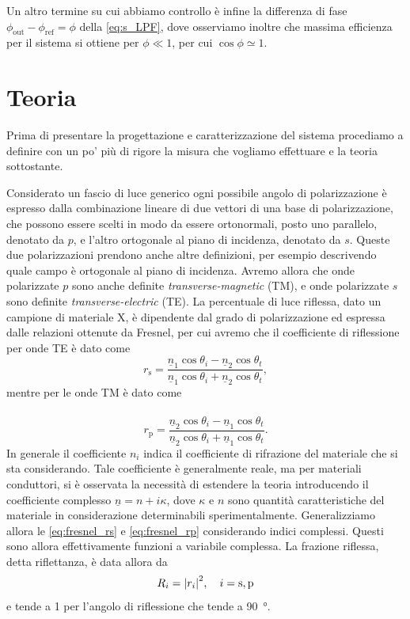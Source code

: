 \documentclass[
    prb,altaffilletter,citeautoscript,
    amsmath,amssymb,
    showpacs,showkeys,floatfix,
    reprint
]{revtex4-1}
\begin{document}
Un altro termine su cui abbiamo controllo è infine la differenza di fase $\phi_\mathrm{out} - \phi_\mathrm{ref} = \phi$ della \eqref{eq:s_LPF}, dove osserviamo inoltre che massima efficienza per il sistema si ottiene per $\phi\ll 1$, per cui $\cos\phi\simeq1$.

\section{Teoria}

Prima di presentare la progettazione e caratterizzazione del sistema procediamo a definire con un po' più di rigore la misura che vogliamo effettuare e la teoria sottostante. 

Considerato un fascio di luce generico ogni possibile angolo di polarizzazione è espresso dalla combinazione lineare di due vettori di una base di polarizzazione, che possono essere scelti in modo da essere ortonormali, posto uno parallelo, denotato da $p$, e l'altro ortogonale al piano di incidenza, denotato da $s$. Queste due polarizzazioni prendono anche altre definizioni, per esempio descrivendo quale campo è ortogonale al piano di incidenza. Avremo allora che onde polarizzate $p$ sono anche definite \emph{transverse-magnetic} (TM), e onde polarizzate $s$ sono definite \emph{transverse-electric} (TE). La percentuale di luce riflessa, dato un campione di materiale X, è dipendente dal grado di polarizzazione ed espressa dalle relazioni ottenute da Fresnel\cite{fresnelCalculationTintsThat2021,fresnelNoteCalculTeintes1821}, per cui avremo che il coefficiente di riflessione per onde TE è dato come \begin{equation}
    r_\mathrm{s} = \frac{\underline{n}_1\cos\theta_i - \underline{n}_2\cos\theta_t}{\underline{n}_1\cos\theta_i + \underline{n}_2\cos\theta_t},
    \label{eq:fresnel_rs}
\end{equation} mentre per le onde TM è dato come \paragraph*{}\begin{equation}
    r_\mathrm{p} = \frac{\underline{n}_2\cos\theta_i - \underline{n}_1\cos\theta_t}{\underline{n}_2\cos\theta_i + \underline{n}_1\cos\theta_t}. 
    \label{eq:fresnel_rp}
\end{equation} In generale il coefficiente $n_i$ indica il coefficiente di rifrazione del materiale che si sta considerando. Tale coefficiente è generalmente reale, ma per materiali conduttori, si è osservata la necessità di estendere la teoria\cite{attwoodSoftXRaysExtreme1999} introducendo il coefficiente complesso $\underline n = n + i\kappa$, dove $\kappa$ e $n$ sono quantità caratteristiche del materiale in considerazione determinabili sperimentalmente. Generalizziamo allora le \eqref{eq:fresnel_rs} e \eqref{eq:fresnel_rp} considerando indici complessi. Questi sono allora effettivamente funzioni a variabile complessa. La frazione riflessa, detta riflettanza, è data allora da \begin{equation}
    R_i= \qty|r_i|^2, \quad i = \mathrm{s,p} \label{eq:R}
\end{equation} e tende a 1 per l'angolo di riflessione che tende a \SI{90}{\degree}.
\end{document}
